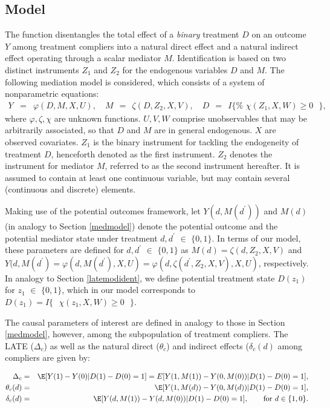 \documentclass[nojss]{jss}
\begin{document}
\subsection{Model}\label{medlatemodel}

The function  disentangles the total effect of a \emph{binary } treatment $D$ on an outcome $Y$ among treatment compliers into a natural direct effect and a natural indirect effect  operating through a scalar mediator $M$. Identification is based on two distinct instruments $Z_{1}$ and $Z_{2} $ for the endogenous variables $D$ and $M$. The following mediation model is considered, which consists of a system of nonparametric equations:
\begin{eqnarray}
Y &=&\varphi (D,M,X,U), \quad M ~~=~~ \zeta (D,Z_{2},X,V), \quad D ~~=~~ I\{ \text{%
  \ }\chi (Z_{1},X,W)\geq 0\text{\ }\} \text{,}  \label{outmodel}
\end{eqnarray}%
where $\varphi ,\zeta ,\chi $ are unknown functions. $U,V,W$ comprise unobservables that may be arbitrarily associated, so that $D$ and $M$ are in general endogenous. $X$ are observed covariates. $Z_{1}$ is the binary instrument for tackling the endogeneity of treatment $D$, henceforth denoted as the
first instrument. $Z_{2}$ denotes the instrument for mediator $M$, referred to as the second instrument hereafter. It is assumed to contain at least one continuous variable, but may contain several (continuous and discrete) elements.

Making use of the potential outcomes framework, let $Y(d,M(d^{\prime }))$ and $M(d)$ (in analogy to Section \ref{medmodel}) denote the potential outcome and the potential mediator state under treatment $d,d^{\prime }$ $\in $ $\{0,1\}$. In terms of our model, these parameters are defined for $d,d^{\prime }$ $\in $ $\{0,1\}$ as
$M(d)=\zeta (d,Z_{2},X,V)$ and $Y(d,M(d^{\prime})=\varphi(d,M(d^{\prime }),X,U)=\varphi (d,\zeta(d^{\prime },Z_{2},X,V),X,U)$, respectively. In analogy to Section \ref{latemodident}, we define potential treatment state $D(z_{1})$ for $z_{1}$ $\in$ $\{0,1\}$, which in our model corresponds to $D(z_{1}) = I\{ \text{\ }\chi (z_{1},X,W)\geq 0\text{\ }\}$.

The causal parameters of interest are defined in analogy to those in Section \ref{medmodel}, however, among the subpopulation of treatment compliers. The LATE ($\Delta_c$) as well as the natural direct ($\theta_c$) and indirect effects ($\delta_c (d)$ among compliers are given by:

\begin{eqnarray}
\Delta_c &=& \E[Y(1)-Y(0)|D(1)-D(0)=1]=E[Y(1,M(1))-Y(0,M(0))|D(1)-D(0)=1], \notag \\ \label{totallate}
\theta_c (d) &=& \E[Y(1,M(d))-Y(0,M(d))|D(1)-D(0)=1],\\
\delta_c (d) &=& \E[Y(d,M(1))-Y(d,M(0))|D(1)-D(0)=1],\quad \quad \text{for }d\in
\{1,0\}.\notag
\end{eqnarray}
\end{document}
